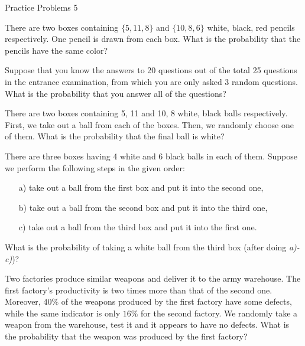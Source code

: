  
 \begin{center}\begin{large} Practice Problems 5
 \end{large}\end{center}
 \bigskip

\bigskip



\begin{problem}
There are two boxes containing $\{5, 11, 8\}$ and $\{10, 8, 6\}$ white, black, red pencils respectively. One pencil is drawn from each box. What is the probability that the pencils have the same color?
\end{problem}
\bigskip


\begin{problem}
Suppose that you know the answers to 20 questions out of the total 25
questions in the entrance examination, from which you are only asked
3 random questions. What is the probability that you answer all of
the questions?
\end{problem}

\bigskip

\begin{problem}
There are two boxes containing {5, 11} and {10, 8} white, black balls
respectively. First, we take out a ball from each of the boxes. Then, we randomly choose one of them. What is the probability that the
final ball is white?
\end{problem}

\bigskip

\begin{problem}
There are three boxes having 4 white and 6 black balls in each of them.
Suppose we perform the following steps in the given order:
    \begin{enumerate}
        \item[a) ] take out a ball from the first box and put it into the second one,
        \item[b) ] take out a ball from the second box and put it into the third one,
        \item[c) ] take out a ball from the third box and put it into the first one.
    \end{enumerate}
    What is the probability of taking a white ball from the third box (after doing \textit{a)-c)})?
\end{problem}

\bigskip

\begin{problem}
Two factories produce similar weapons and deliver it to the army warehouse. The first factory’s productivity is two times more than that of
the second one. Moreover, $40\%$ of the weapons produced by the first
factory have some defects, while the same indicator is only $16\%$ for
the second factory. We randomly take a weapon from the warehouse,
test it and it appears to have no defects. What is the probability that
the weapon was produced by the first factory?

\end{problem}


